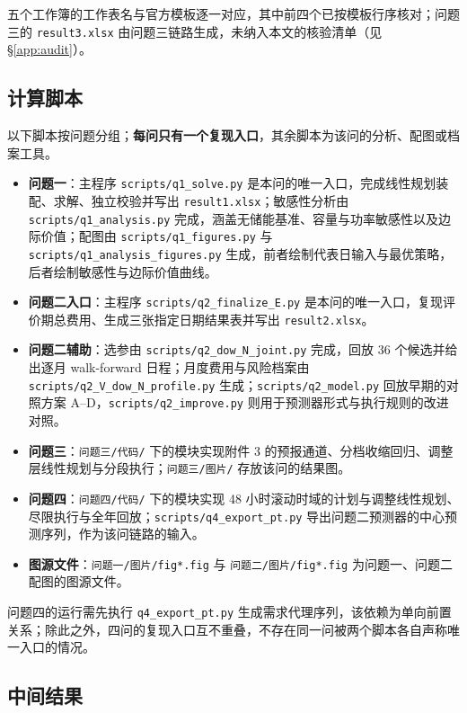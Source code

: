 五个工作簿的工作表名与官方模板逐一对应，其中前四个已按模板行序核对；问题三的 \texttt{result3.xlsx} 由问题三链路生成，未纳入本文的核验清单（见 \S\ref{app:audit}）。

\subsection{计算脚本}

以下脚本按问题分组；\textbf{每问只有一个复现入口}，其余脚本为该问的分析、配图或档案工具。

\begin{itemize}
  \sloppy \footnotesize
  \item \textbf{问题一}：主程序 \texttt{scripts/q1\_solve.py} 是本问的唯一入口，完成线性规划装配、求解、独立校验并写出 \texttt{result1.xlsx}；敏感性分析由 \texttt{scripts/q1\_analysis.py} 完成，涵盖无储能基准、容量与功率敏感性以及边际价值；配图由 \texttt{scripts/q1\_figures.py} 与 \texttt{scripts/q1\_analysis\_figures.py} 生成，前者绘制代表日输入与最优策略，后者绘制敏感性与边际价值曲线。
  \item \textbf{问题二入口}：主程序 \texttt{scripts/q2\_finalize\_E.py} 是本问的唯一入口，复现评价期总费用、生成三张指定日期结果表并写出 \texttt{result2.xlsx}。
  \item \textbf{问题二辅助}：选参由 \texttt{scripts/q2\_dow\_N\_joint.py} 完成，回放 36 个候选并给出逐月 walk-forward 日程；月度费用与风险档案由 \texttt{scripts/q2\_V\_dow\_N\_profile.py} 生成；\texttt{scripts/q2\_model.py} 回放早期的对照方案 A--D，\texttt{scripts/q2\_improve.py} 则用于预测器形式与执行规则的改进对照。
  \item \textbf{问题三}：\texttt{问题三/代码/} 下的模块实现附件 3 的预报通道、分档收缩回归、调整层线性规划与分段执行；\texttt{问题三/图片/} 存放该问的结果图。
  \item \textbf{问题四}：\texttt{问题四/代码/} 下的模块实现 48 小时滚动时域的计划与调整线性规划、尽限执行与全年回放；\texttt{scripts/q4\_export\_pt.py} 导出问题二预测器的中心预测序列，作为该问链路的输入。
  \item \textbf{图源文件}：\texttt{问题一/图片/fig*.fig} 与 \texttt{问题二/图片/fig*.fig} 为问题一、问题二配图的图源文件。
\end{itemize}

问题四的运行需先执行 \texttt{q4\_export\_pt.py} 生成需求代理序列，该依赖为单向前置关系；除此之外，四问的复现入口互不重叠，不存在同一问被两个脚本各自声称唯一入口的情况。

\subsection{中间结果}

